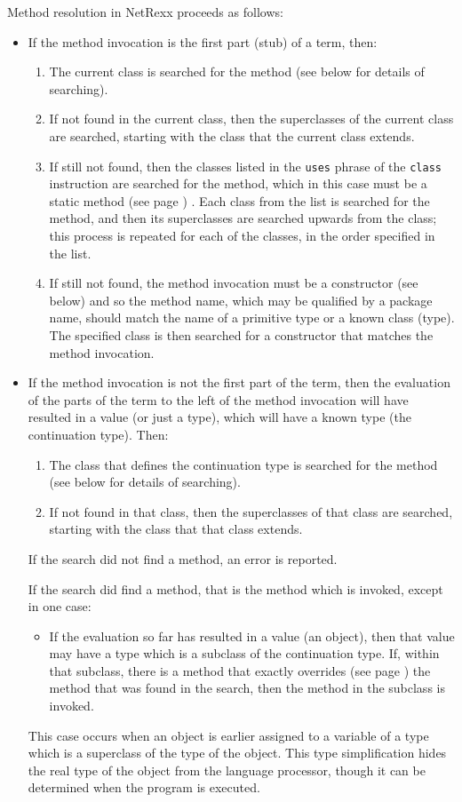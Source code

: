 Method resolution in NetRexx proceeds as follows:
\begin{itemize}
\item 
If the method invocation is the first part (stub) of a term, then:
\begin{enumerate}
\item 
The current class is searched for the method (see below for details of
searching).
\item If not found in the current class, then the superclasses of the
current class are searched, starting with the class that the current
class extends.
\item 
If still not found, then the classes listed in the \texttt{uses} phrase
of the \texttt{class} instruction are searched for the method, which in
this case must be a  static method (see page \pageref{refstatmet}) .
Each class from the list is searched for the method, and then its
superclasses are searched upwards from the class; this process is
repeated for each of the classes, in the order specified in the list.
\item 
If still not found, the method invocation must be a constructor (see
below) and so the method name, which may be qualified by a package name,
should match the name of a primitive type or a known class (type).
The specified class is then searched for a constructor that matches the
method invocation.
\end{enumerate}
\item 
If the method invocation is not the first part of the term, then the
evaluation of the parts of the term to the left of the method invocation
will have resulted in a value (or just a type), which will have a known
type (the continuation type).
Then:
\begin{enumerate}
\item 
The class that defines the continuation type is searched for the method
(see below for details of searching).
\item If not found in that class, then the superclasses of that class are
searched, starting with the class that that class extends.
\end{enumerate}
 If the search did not find a method, an error is reported.
 
If the search did find a method, that is the method which is invoked,
except in one case:
\begin{itemize}
\item If the evaluation so far has resulted in a value (an object), then
that value may have a type which is a subclass of the continuation type.
If, within that subclass, there is a method that
 exactly overrides (see page \pageref{refoverrid})  the method that was found in the
search, then the method in the subclass is invoked.
\end{itemize}

This case occurs when an object is earlier assigned to a variable of a
type which is a superclass of the type of the object.  This type
simplification hides the real type of the object from the language
processor, though it can be determined when the program is executed.
\end{itemize}
 
